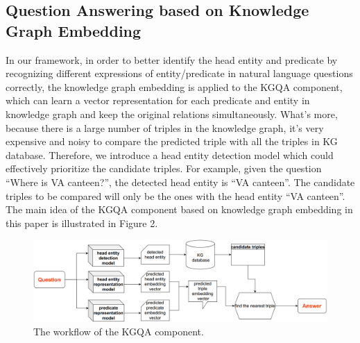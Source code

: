 \documentclass[11pt]{article}
\begin{document}
\subsection{Question Answering based on Knowledge Graph Embedding}\label{sec:Knowledge Embedding Based KGQA}
In our framework, in order to better identify the head entity and predicate by recognizing different expressions of entity/predicate in natural language questions \cite{c8,c9} correctly, the knowledge graph embedding \cite{c9, c11} is applied to the KGQA component, which can learn a vector representation for each predicate and entity in knowledge graph and keep the original relations simultaneously. What's more, because there is a large number of triples in the knowledge graph, it's very expensive and noisy to compare the predicted triple with all the triples in KG database. Therefore, we introduce a head entity detection model which could effectively prioritize the candidate triples. For example, given the question ``Where is VA canteen?'', the detected head entity is ``VA canteen''. The candidate triples to be compared will only be the ones with the head entity ``VA canteen''. The main idea of the KGQA component based on knowledge graph embedding in this paper is illustrated in Figure 2.

\begin{figure}[htp]
    \centering
    \includegraphics[width=17cm]{submissions/kbqa-colledge/figs/figure2.pdf}
    \caption{The workflow of the KGQA component.}
\end{figure}
\end{document}
